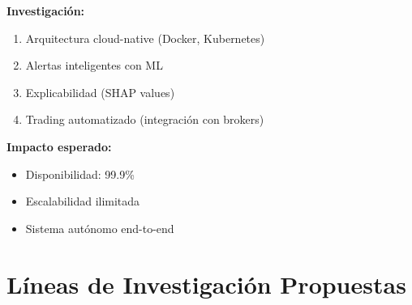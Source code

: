 \documentclass[12pt,a4paper]{article}
\begin{document}
\textbf{Investigación:}
\begin{enumerate}
    \item Arquitectura cloud-native (Docker, Kubernetes)
    \item Alertas inteligentes con ML
    \item Explicabilidad (SHAP values)
    \item Trading automatizado (integración con brokers)
\end{enumerate}

\textbf{Impacto esperado:}
\begin{itemize}
    \item Disponibilidad: 99.9\%
    \item Escalabilidad ilimitada
    \item Sistema autónomo end-to-end
\end{itemize}

\section{Líneas de Investigación Propuestas}
\end{document}
